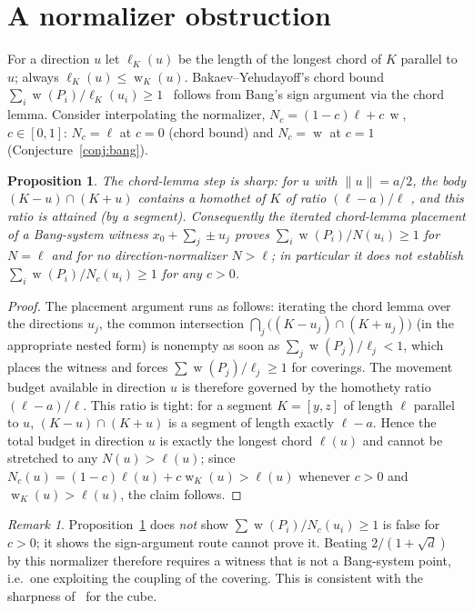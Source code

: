 \documentclass[11pt,reqno]{amsart}
\theoremstyle{plain}
\newtheorem{proposition}[theorem]{Proposition}
\theoremstyle{definition}
\theoremstyle{remark}
\newtheorem{remark}[theorem]{Remark}
\DeclareMathOperator{\wid}{w}
\begin{document}
\section{A normalizer obstruction}\label{sec:nogo}
For a direction $u$ let $\ell_K(u)$ be the length of the longest chord of $K$
parallel to $u$; always $\ell_K(u)\le\wid_K(u)$. Bakaev--Yehudayoff's chord bound
$\sum_i\wid(P_i)/\ell_K(u_i)\ge1$~\cite{BY26} follows from Bang's sign argument
via the chord lemma. Consider interpolating the normalizer,
$N_c=(1-c)\ell+c\,\wid$, $c\in[0,1]$: $N_c=\ell$ at $c=0$ (chord bound) and
$N_c=\wid$ at $c=1$ (Conjecture~\ref{conj:bang}).
\begin{proposition}\label{thm:nogo}
The chord-lemma step is sharp: for $u$ with $\|u\|=a/2$, the body
$(K-u)\cap(K+u)$ contains a homothet of $K$ of ratio $(\ell-a)/\ell$
\cite[Lem.~2.3]{Verreault}, and this ratio is attained (by a segment). Consequently
the iterated chord-lemma placement of a Bang-system witness $x_0+\sum_j\pm u_j$
proves $\sum_i\wid(P_i)/N(u_i)\ge1$ for $N=\ell$ and for no direction-normalizer
$N>\ell$; in particular it does not establish $\sum_i\wid(P_i)/N_c(u_i)\ge1$ for
any $c>0$.
\end{proposition}
\begin{proof}
The placement argument runs as follows: iterating the chord lemma over the
directions $u_j$, the common intersection $\bigcap_j\bigl((K-u_j)\cap(K+u_j)\bigr)$
(in the appropriate nested form) is nonempty as soon as
$\sum_j\wid(P_j)/\ell_j<1$, which places the witness and forces
$\sum\wid(P_j)/\ell_j\ge1$ for coverings. The movement budget available in
direction $u$ is therefore governed by the homothety ratio $(\ell-a)/\ell$. This
ratio is tight: for a segment $K=[y,z]$ of length $\ell$ parallel to $u$,
$(K-u)\cap(K+u)$ is a segment of length exactly $\ell-a$. Hence the total budget in
direction $u$ is exactly the longest chord $\ell(u)$ and cannot be stretched to any
$N(u)>\ell(u)$; since $N_c(u)=(1-c)\ell(u)+c\wid_K(u)>\ell(u)$ whenever $c>0$ and
$\wid_K(u)>\ell(u)$, the claim follows.
\end{proof}
\begin{remark}
Proposition~\ref{thm:nogo} does \emph{not} show $\sum\wid(P_i)/N_c(u_i)\ge1$ is false
for $c>0$; it shows the sign-argument route cannot prove it. Beating $2/(1+\sqrt d)$ by
this normalizer therefore requires a witness that is not a Bang-system point, i.e.\
one exploiting the coupling of the covering. This is consistent with the
sharpness of~\cite{BY26} for the cube.
\end{remark}
\end{document}
